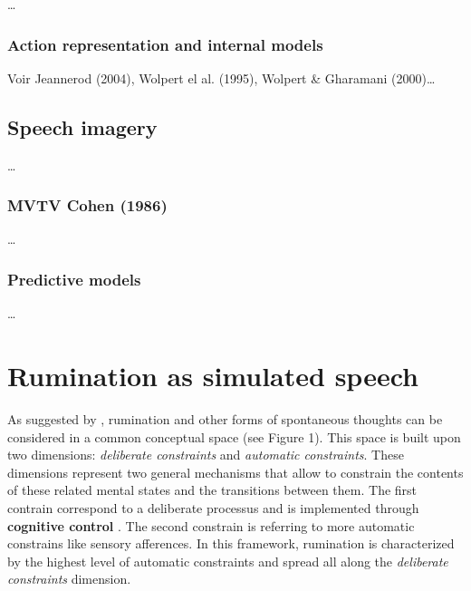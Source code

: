\documentclass[12pt,]{book}
\begin{document}
\ldots{}

\subsection{Action representation and internal
models}\label{action-representation-and-internal-models}

Voir Jeannerod (2004), Wolpert el al. (1995), Wolpert \& Gharamani
(2000)\ldots{}

\section{Speech imagery}\label{speech-imagery}

\ldots{}

\subsection{MVTV Cohen (1986)}\label{mvtv-cohen-1986}

\ldots{}

\subsection{Predictive models}\label{predictive-models}

\ldots{}

\chapter{Rumination as simulated
speech}\label{rumination-as-simulated-speech}

As suggested by \citet{Christoff2016}, rumination and other forms of
spontaneous thoughts can be considered in a common conceptual space (see
Figure 1). This space is built upon two dimensions: \emph{deliberate
constraints} and \emph{automatic constraints}. These dimensions
represent two general mechanisms that allow to constrain the contents of
these related mental states and the transitions between them. The first
contrain correspond to a deliberate processus and is implemented through
\textbf{cognitive control} \citep{Miller2000}. The second constrain is
referring to more automatic constrains like sensory afferences. In this
framework, rumination is characterized by the highest level of automatic
constraints and spread all along the \emph{deliberate constraints}
dimension.
\end{document}

